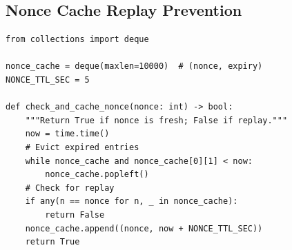 \documentclass[10pt,conference]{IEEEtran}
\begin{document}
\subsection{Nonce Cache Replay Prevention}

\begin{lstlisting}[caption={Time-bounded nonce cache with FIFO eviction.}]
from collections import deque

nonce_cache = deque(maxlen=10000)  # (nonce, expiry)
NONCE_TTL_SEC = 5

def check_and_cache_nonce(nonce: int) -> bool:
    """Return True if nonce is fresh; False if replay."""
    now = time.time()
    # Evict expired entries
    while nonce_cache and nonce_cache[0][1] < now:
        nonce_cache.popleft()
    # Check for replay
    if any(n == nonce for n, _ in nonce_cache):
        return False
    nonce_cache.append((nonce, now + NONCE_TTL_SEC))
    return True
\end{lstlisting}

\end{document}
